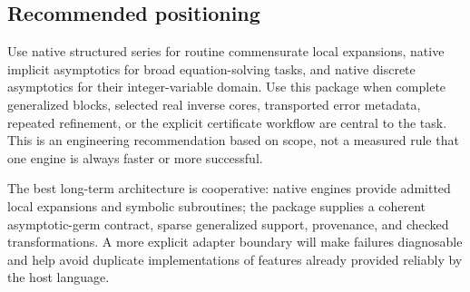 \subsection{Recommended positioning}
Use native structured series for routine commensurate local expansions, native implicit asymptotics for broad equation-solving tasks, and native discrete asymptotics for their integer-variable domain. Use this package when complete generalized blocks, selected real inverse cores, transported error metadata, repeated refinement, or the explicit certificate workflow are central to the task. This is an engineering recommendation based on scope, not a measured rule that one engine is always faster or more successful.

The best long-term architecture is cooperative: native engines provide admitted local expansions and symbolic subroutines; the package supplies a coherent asymptotic-germ contract, sparse generalized support, provenance, and checked transformations. A more explicit adapter boundary will make failures diagnosable and help avoid duplicate implementations of features already provided reliably by the host language.
